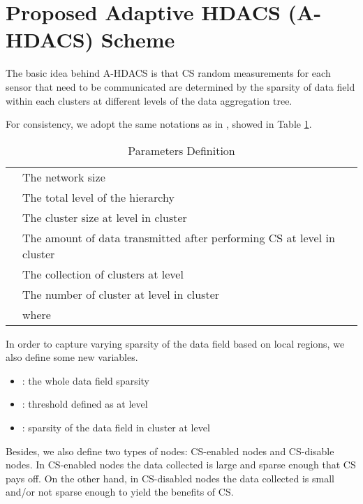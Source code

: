 \documentclass[conference]{IEEEtran}
\begin{document}
\section{Proposed Adaptive HDACS (A-HDACS) Scheme}
The basic idea behind A-HDACS is that CS random measurements for 
each sensor that need to be communicated are determined by the sparsity of data field 
within each clusters at different levels of the data aggregation tree.

For consistency, we adopt the same notations as in \cite{HDACS},  showed in Table \ref{ParaDef1}. 

\begin{table}[!t]
\centering
\caption{Parameters Definition} \label{ParaDef1}
\begin{tabular}{ |l|l| }
  \hline
            & The network size\\
            & The total level of the hierarchy\\
  & The cluster size at level  in cluster \\ 
  & The amount of data transmitted after performing CS at level  in cluster \\
         & The collection of clusters at level \\
     & The number of cluster at level  in cluster \\
                  & where \\
   \hline
\end{tabular}
\end{table}

In order to capture varying sparsity of the data field based on local regions, we also define some new variables.
\begin{itemize}
  \item : the whole data field sparsity\\
  \item : threshold defined as
   at level \\
  \item : sparsity of the data field in cluster  at level \\    
\end{itemize}

Besides, we also define two types of nodes: CS-enabled nodes and 
CS-disable nodes. In CS-enabled nodes the data collected is large and sparse enough that CS pays off.
On the other hand, in CS-disabled nodes the data collected is small and/or not sparse enough to yield the benefits of CS.  
\end{document}
